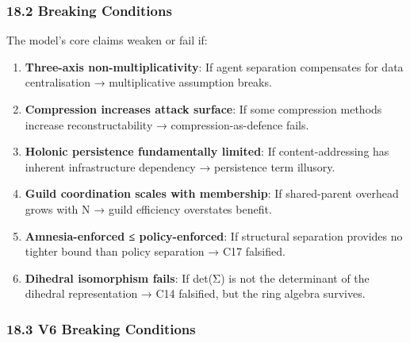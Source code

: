 \documentclass[
  11pt,
]{article}
\providecommand{\tightlist}{%
  \setlength{\itemsep}{0pt}\setlength{\parskip}{0pt}}
\begin{document}
\subsubsection{18.2 Breaking Conditions}\label{breaking-conditions}

The model's core claims weaken or fail if:

\begin{enumerate}
\def\labelenumi{\arabic{enumi}.}
\tightlist
\item
  \textbf{Three-axis non-multiplicativity}: If agent separation
  compensates for data centralisation → multiplicative assumption
  breaks.
\item
  \textbf{Compression increases attack surface}: If some compression
  methods increase reconstructability → compression-as-defence fails.
\item
  \textbf{Holonic persistence fundamentally limited}: If
  content-addressing has inherent infrastructure dependency →
  persistence term illusory.
\item
  \textbf{Guild coordination scales with membership}: If shared-parent
  overhead grows with N → guild efficiency overstates benefit.
\item
  \textbf{Amnesia-enforced ≤ policy-enforced}: If structural separation
  provides no tighter bound than policy separation → C17 falsified.
\item
  \textbf{Dihedral isomorphism fails}: If det(Σ) is not the determinant
  of the dihedral representation → C14 falsified, but the ring algebra
  survives.
\end{enumerate}

\subsubsection{18.3 V6 Breaking
Conditions}\label{v6-breaking-conditions}
\end{document}
